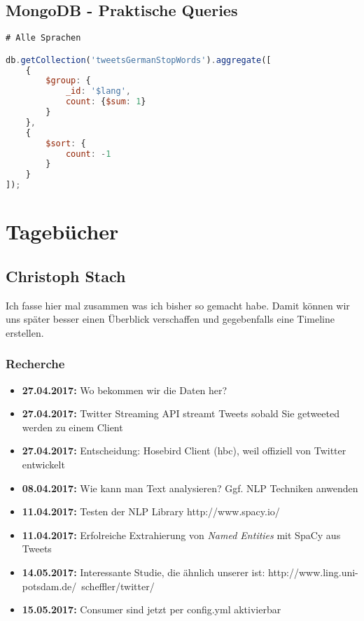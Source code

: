 \documentclass[12pt, 
	a4paper, 
	oneside, 
	leqno]{scrreprt}
\begin{document}
\section{MongoDB - Praktische Queries}

\begin{lstlisting}[language=JavaScript]
# Alle Sprachen

db.getCollection('tweetsGermanStopWords').aggregate([
    { 
        $group: { 
            _id: '$lang',
            count: {$sum: 1}
        }
    },
    {
        $sort: {
            count: -1
        }
    }
]);
\end{lstlisting}

\chapter{Tagebücher}

\section{Christoph Stach}

Ich fasse hier mal zusammen was ich bisher so gemacht habe.
Damit können wir uns später besser einen Überblick verschaffen und gegebenfalls eine Timeline erstellen.

\subsection*{Recherche}

\begin{itemize}
  \item \textbf{27.04.2017:} Wo bekommen wir die Daten her?
  \item \textbf{27.04.2017:} Twitter Streaming API streamt Tweets sobald Sie getweeted werden zu einem Client
  \item \textbf{27.04.2017:} Entscheidung: Hosebird Client (hbc), weil offiziell von Twitter entwickelt
  \item \textbf{08.04.2017:} Wie kann man Text analysieren? Ggf. NLP Techniken anwenden
  \item \textbf{11.04.2017:} Testen der NLP Library http://www.spacy.io/
  \item \textbf{11.04.2017:} Erfolreiche Extrahierung von \textit{Named Entities} mit SpaCy aus Tweets
  \item \textbf{14.05.2017:} Interessante Studie, die ähnlich unserer ist: http://www.ling.uni-potsdam.de/~scheffler/twitter/
  \item \textbf{15.05.2017:} Consumer sind jetzt per config.yml aktivierbar  
\end{itemize}
\end{document}
